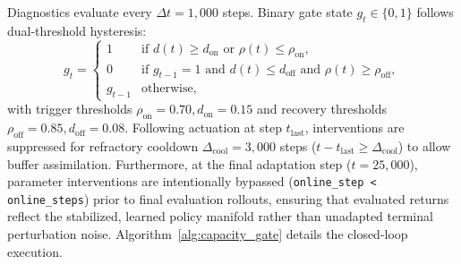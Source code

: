 \documentclass{article}
\begin{document}
Diagnostics evaluate every $\Delta t = 1,000$ steps. Binary gate state $g_t \in \{0, 1\}$ follows dual-threshold hysteresis:
\begin{equation}
    g_t = \begin{cases}
        1 & \text{if } d(t) \ge d_{\mathrm{on}} \text{ or } \rho(t) \le \rho_{\mathrm{on}}, \\
        0 & \text{if } g_{t-1} = 1 \text{ and } d(t) \le d_{\mathrm{off}} \text{ and } \rho(t) \ge \rho_{\mathrm{off}}, \\
        g_{t-1} & \text{otherwise},
    \end{cases}
\end{equation}
with trigger thresholds $\rho_{\mathrm{on}} = 0.70, d_{\mathrm{on}} = 0.15$ and recovery thresholds $\rho_{\mathrm{off}} = 0.85, d_{\mathrm{off}} = 0.08$. Following actuation at step $t_{\mathrm{last}}$, interventions are suppressed for refractory cooldown $\Delta_{\mathrm{cool}} = 3,000$ steps ($t - t_{\mathrm{last}} \ge \Delta_{\mathrm{cool}}$) to allow buffer assimilation. Furthermore, at the final adaptation step ($t = 25,000$), parameter interventions are intentionally bypassed (\texttt{online\_step < online\_steps}) prior to final evaluation rollouts, ensuring that evaluated returns reflect the stabilized, learned policy manifold rather than unadapted terminal perturbation noise. Algorithm~\ref{alg:capacity_gate} details the closed-loop execution.
\end{document}
